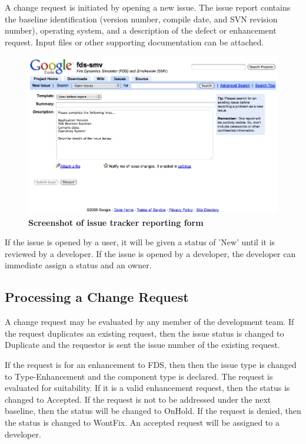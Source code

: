 \documentclass[11pt]{book}
\begin{document}
A change request is initiated by opening a new issue.  The issue report contains the baseline identification (version number, compile date, and SVN revision number),
operating system, and a description of the defect or enhancement request.  Input files or other supporting documentation can be attached.

\begin{figure}[ht!]
\includegraphics[width=\textwidth]{FIGURES/NewIssue.jpg}
\caption{\bf Screenshot of issue tracker reporting form}
\label{fig:issueform}
\end{figure}

If the issue is opened by a user, it will be given a status of 'New' until it is reviewed by a developer.  If the
issue is opened by a developer, the developer can immediate assign a status and an owner.

\subsection{Processing a Change Request}

A change request may be evaluated by any member of the development team.
If the request duplicates an existing request, then the issue status is changed to {\ct Duplicate} and the
requestor is sent the issue number of the existing request.

If the request is for an enhancement to FDS, then then the issue type is changed to {\ct Type-Enhancement} and the
component type is declared. The request is evaluated for suitability.  If it is a valid enhancement
request, then the status is changed to {\ct Accepted}.  If the request is not to
be addressed under the next baseline, then the status will be changed to {\ct OnHold}.  If the request is denied, then
the status is changed to {\ct WontFix}.  An accepted request will be assigned to a developer.
\end{document}
